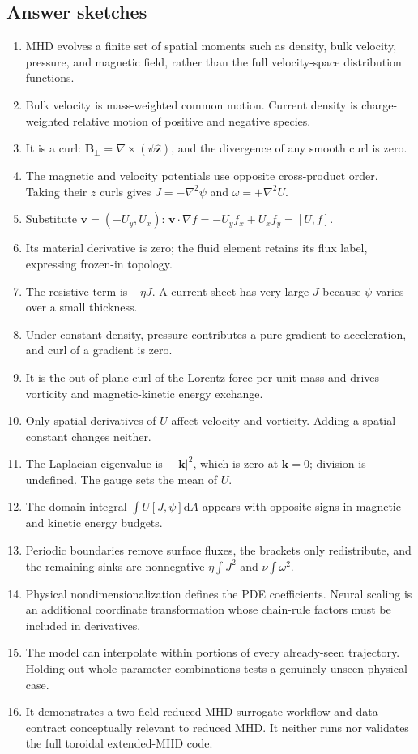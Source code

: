 \documentclass[11pt]{article}
\newcommand{\dd}{\mathrm{d}}
\newcommand{\vect}[1]{\bm{#1}}
\begin{document}
\subsection*{Answer sketches}

\begin{enumerate}[label=\textbf{A\arabic*.}]
  \item MHD evolves a finite set of spatial moments such as density, bulk velocity, pressure, and magnetic field, rather than the full velocity-space distribution functions.
  \item Bulk velocity is mass-weighted common motion. Current density is charge-weighted relative motion of positive and negative species.
  \item It is a curl: $\vect{B}_\perp=\nabla\times(\psi\widehat{\vect{z}})$, and the divergence of any smooth curl is zero.
  \item The magnetic and velocity potentials use opposite cross-product order. Taking their $z$ curls gives $J=-\nabla^2\psi$ and $\omega=+\nabla^2U$.
  \item Substitute $\vect{v}=(-U_y,U_x)$: $\vect{v}\cdot\nabla f=-U_yf_x+U_xf_y=[U,f]$.
  \item Its material derivative is zero; the fluid element retains its flux label, expressing frozen-in topology.
  \item The resistive term is $-\eta J$. A current sheet has very large $J$ because $\psi$ varies over a small thickness.
  \item Under constant density, pressure contributes a pure gradient to acceleration, and curl of a gradient is zero.
  \item It is the out-of-plane curl of the Lorentz force per unit mass and drives vorticity and magnetic-kinetic energy exchange.
  \item Only spatial derivatives of $U$ affect velocity and vorticity. Adding a spatial constant changes neither.
  \item The Laplacian eigenvalue is $-|\vect{k}|^2$, which is zero at $\vect{k}=0$; division is undefined. The gauge sets the mean of $U$.
  \item The domain integral $\int U[J,\psi]\dd A$ appears with opposite signs in magnetic and kinetic energy budgets.
  \item Periodic boundaries remove surface fluxes, the brackets only redistribute, and the remaining sinks are nonnegative $\eta\int J^2$ and $\nu\int\omega^2$.
  \item Physical nondimensionalization defines the PDE coefficients. Neural scaling is an additional coordinate transformation whose chain-rule factors must be included in derivatives.
  \item The model can interpolate within portions of every already-seen trajectory. Holding out whole parameter combinations tests a genuinely unseen physical case.
  \item It demonstrates a two-field reduced-MHD surrogate workflow and data contract conceptually relevant to reduced MHD. It neither runs nor validates the full toroidal extended-MHD code.
\end{enumerate}
\end{document}
